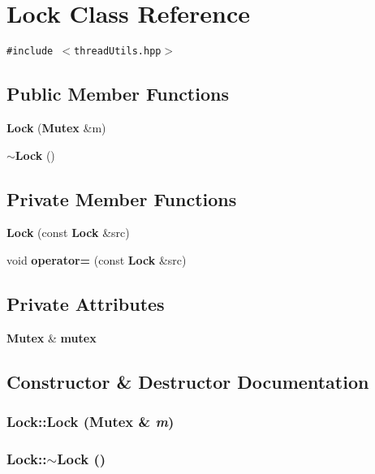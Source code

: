 \section{Lock Class Reference}
\label{classLock}
{\tt \#include $<$thread\-Utils.hpp$>$}

\subsection*{Public Member Functions}
\begin{CompactItemize}
\item 
{\bf Lock} ({\bf Mutex} \&m)
\item 
{\bf $\sim$Lock} ()
\end{CompactItemize}
\subsection*{Private Member Functions}
\begin{CompactItemize}
\item 
{\bf Lock} (const {\bf Lock} \&src)
\item 
void {\bf operator=} (const {\bf Lock} \&src)
\end{CompactItemize}
\subsection*{Private Attributes}
\begin{CompactItemize}
\item 
{\bf Mutex} \& {\bf mutex}
\end{CompactItemize}


\subsection{Constructor \& Destructor Documentation}
\subsubsection{\setlength{\rightskip}{0pt plus 5cm}Lock::Lock ({\bf Mutex} \& {\em m})\hspace{0.3cm}{\tt  [inline]}}\label{classLock_2c786576eddddb484a6a02a7dea52904}


\subsubsection{\setlength{\rightskip}{0pt plus 5cm}Lock::$\sim$Lock ()\hspace{0.3cm}{\tt  [inline]}}\label{classLock_7ab6d9485c8665bb3643710432882971}


